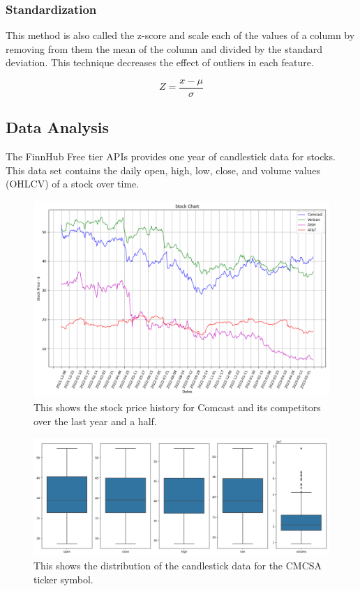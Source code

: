 \documentclass[conference]{IEEEtran}
\begin{document}
\subsubsection{Standardization}

This method is also called the z-score and scale each of the values of a column by removing from them the mean of the column and divided by the standard deviation.
This technique decreases the effect of outliers in each feature.

\begin{equation}
    Z = \frac{x - \mu}{\sigma}
\end{equation}


\subsection{Data Analysis}

The FinnHub Free tier APIs provides one year of candlestick data for stocks.
This data set contains the daily open, high, low, close, and volume values (OHLCV) of a stock over time.

\begin{figure}
    \includegraphics[width=\columnwidth]{stock_chart}
    \caption{This shows the stock price history for Comcast and its competitors over the last year and a half.}
\end{figure}

\begin{figure}
    \includegraphics[width=\columnwidth]{data_distribution}
    \caption{This shows the distribution of the candlestick data for the CMCSA ticker symbol.}
\end{figure}
\end{document}
